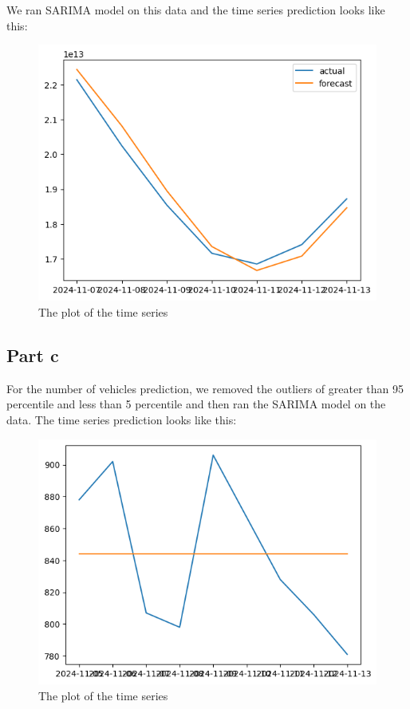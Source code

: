 \documentclass{article}
\begin{document}
We ran SARIMA model on this data and the time series prediction looks like this:

\begin{figure}[H]
\centering
\includegraphics[width=\textwidth]{1b_image.png}
\caption{The plot of the time series}
\end{figure}

\subsection{Part c}

For the number of vehicles prediction, we removed the outliers of greater than 95 percentile and less than 5 percentile and then ran the SARIMA model on the data. The time series prediction looks like this:

\begin{figure}[H]
\centering
\includegraphics[width=\textwidth]{1c_image_1.png}
\caption{The plot of the time series}
\end{figure}
\end{document}
